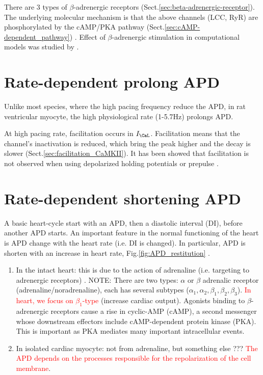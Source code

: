 There are 3 types of $\beta$-adrenergic receptors
(Sect.\ref{sec:beta-adrenergic-receptor}).
The underlying molecular mechanism is that the above channels (LCC, RyR) are
phosphorylated by the cAMP/PKA pathway (Sect.\ref{sec:cAMP-dependent_pathway})
\citep{Kamp2000, Reiken2003, hain1994}. Effect of $\beta$-adrenergic stimulation
in computational models was studied by \citep{koh2006}.


\section{Rate-dependent prolong APD}

Unlike most species, where the high pacing frequency reduce the APD, in rat
ventricular myocyte, the high physiological rate (1-5.7Hz) prolongs APD.

At high pacing rate, facilitation occurs in $I_\CaL$. Facilitation means that
the channel's inactivation is reduced, which bring the peak higher and the decay
is slower (Sect.\ref{sec:facilitation_CaMKII}). It has been showed that facilitation is not
observed when using depolarized holding potentials or prepulse \citep{brette2006cc}.


\section{Rate-dependent shortening APD}

A basic heart-cycle start with an APD, then a diastolic interval (DI), before
another APD starts. An important feature in the normal functioning of the heart
is APD change with the heart rate (i.e. DI is changed). In particular, APD is
shorten with an increase in heart rate, Fig.\ref{fig:APD_restitution} \citep{boyett1978}.

\begin{enumerate}
  
  \item In the intact heart: this is due to the action of adrenaline (i.e.
  targeting to adrenergic receptors) \citep{morad1972}. NOTE: There are
  two types: $\alpha$ or $\beta$ adrenalic receptor (adrenaline/noradrenaline),
  each has several subtypes ($\alpha_1, \alpha_2, \beta_1, \beta_2, \beta_3$).
  \textcolor{red}{In heart, we focus on $\beta_1$-type} (increase cardiac
  output). Agonists binding to $\beta$-adrenergic receptors cause a rise in
  cyclic-AMP (cAMP), a second messenger whose downstream effectors include
  cAMP-dependent  protein kinase (PKA). This is  important as PKA mediates many
  important  intracellular events. 
  
  \item In isolated cardiac myocyte: not from adrenaline, but something else ??? 
  \textcolor{red}{The APD depends on the processes responsible for the
  repolarization of the cell membrane}. 
\end{enumerate}
 
